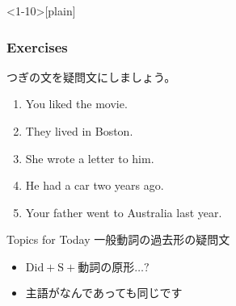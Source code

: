 \documentclass[aspectratio=169,xcolor={dvipsnames,table}]{beamer}
\newcommand{\myaudio}[1]{\href{#1}{\faVolumeUp}}
\begin{document}
\begin{frame}<1-10>[plain]\frametitle{Exercises}

つぎの文を疑問文にしましょう。

 \begin{enumerate}
  \item<1-> You liked the movie.\hspace{59.7pt}
  \item<1-> They lived in Boston.\hspace{62pt}%
  \item<1-> She wrote a letter to him.\hspace{42pt}%
  \item<1-> He had  a car two years ago.\hspace{30.5pt}%
  \item<1-> Your father went to  Australia last year.\\
 \mbox{}\hfill{}
 \end{enumerate}

\begin{exampleblock}{Topics for Today}
\small
一般動詞の過去形の疑問文
\begin{itemize}
 \item  \textcolor{NavyBlue}{\bfseries $\text{Did} + \text{S} + \text{動詞の原形} \ldots ?$}
 \item  主語がなんであっても同じです
\end{itemize}
      \end{exampleblock}

\vspace{-10pt}
\mbox{}\hfill\myaudio{./audio/027_past_did_you_04.mp3}


\end{frame}
\end{document}
